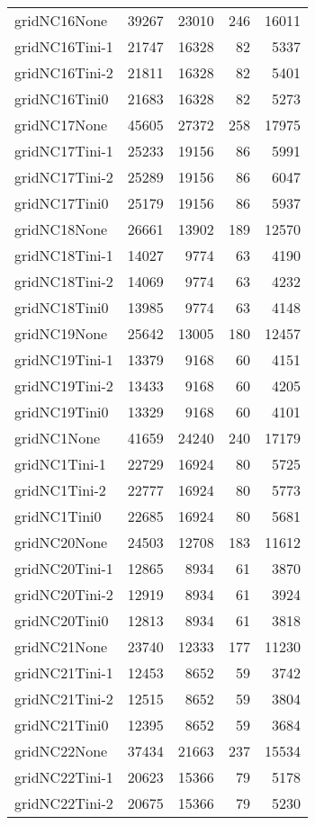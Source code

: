 \begin{longtable}{lrrrr}
gridNC16None & 39267 & 23010 & 246 & 16011 \\
gridNC16Tini-1 & 21747 & 16328 & 82 & 5337 \\
gridNC16Tini-2 & 21811 & 16328 & 82 & 5401 \\
gridNC16Tini0 & 21683 & 16328 & 82 & 5273 \\
gridNC17None & 45605 & 27372 & 258 & 17975 \\
gridNC17Tini-1 & 25233 & 19156 & 86 & 5991 \\
gridNC17Tini-2 & 25289 & 19156 & 86 & 6047 \\
gridNC17Tini0 & 25179 & 19156 & 86 & 5937 \\
gridNC18None & 26661 & 13902 & 189 & 12570 \\
gridNC18Tini-1 & 14027 & 9774 & 63 & 4190 \\
gridNC18Tini-2 & 14069 & 9774 & 63 & 4232 \\
gridNC18Tini0 & 13985 & 9774 & 63 & 4148 \\
gridNC19None & 25642 & 13005 & 180 & 12457 \\
gridNC19Tini-1 & 13379 & 9168 & 60 & 4151 \\
gridNC19Tini-2 & 13433 & 9168 & 60 & 4205 \\
gridNC19Tini0 & 13329 & 9168 & 60 & 4101 \\
gridNC1None & 41659 & 24240 & 240 & 17179 \\
gridNC1Tini-1 & 22729 & 16924 & 80 & 5725 \\
gridNC1Tini-2 & 22777 & 16924 & 80 & 5773 \\
gridNC1Tini0 & 22685 & 16924 & 80 & 5681 \\
gridNC20None & 24503 & 12708 & 183 & 11612 \\
gridNC20Tini-1 & 12865 & 8934 & 61 & 3870 \\
gridNC20Tini-2 & 12919 & 8934 & 61 & 3924 \\
gridNC20Tini0 & 12813 & 8934 & 61 & 3818 \\
gridNC21None & 23740 & 12333 & 177 & 11230 \\
gridNC21Tini-1 & 12453 & 8652 & 59 & 3742 \\
gridNC21Tini-2 & 12515 & 8652 & 59 & 3804 \\
gridNC21Tini0 & 12395 & 8652 & 59 & 3684 \\
gridNC22None & 37434 & 21663 & 237 & 15534 \\
gridNC22Tini-1 & 20623 & 15366 & 79 & 5178 \\
gridNC22Tini-2 & 20675 & 15366 & 79 & 5230 \\

\end{longtable}
